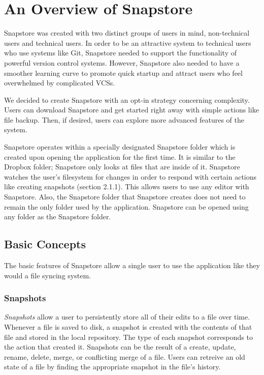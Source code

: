 \chapter{An Overview of Snapstore}

Snapstore was created with two distinct groups of users in mind, non-technical users and technical users. In order to be an attractive system to technical users who use systems like Git, Snapstore needed to support the functionality of powerful version control systems. However, Snapstore also needed to have a smoother learning curve to promote quick startup and attract users who feel overwhelmed by complicated VCSs. 

We decided to create Snapstore with an opt-in strategy concerning complexity. Users can download Snapstore and get started right away with simple actions like file backup. Then, if desired, users can explore more advanced features of the system.


Snapstore operates within a specially designated Snapstore folder which is created upon opening the application for the first time. It is similar to the Dropbox folder; Snapstore only looks at files that are inside of it. Snapstore watches the user's filesystem for changes in order to respond with certain actions like creating snapshots (section 2.1.1). This allows users to use any editor with Snapstore. Also, the Snapstore folder that Snapstore creates does not need to remain the only folder used by the application. Snapstore can be opened using any folder as the Snapstore folder.

\section{Basic Concepts}

The basic features of Snapstore allow a single user to use the application like they would a file syncing system.

\subsection{Snapshots}

\textit{Snapshots} allow a user to persistently store all of their edits to a file over time. Whenever a file is saved to disk, a snapshot is created with the contents of that file and stored in the local repository. The type of each snapshot corresponds to the action that created it. Snapshots can be the result of a create, update, rename, delete, merge, or conflicting merge of a file. Users can retreive an old state of a file by finding the appropriate snapshot in the file's history.

